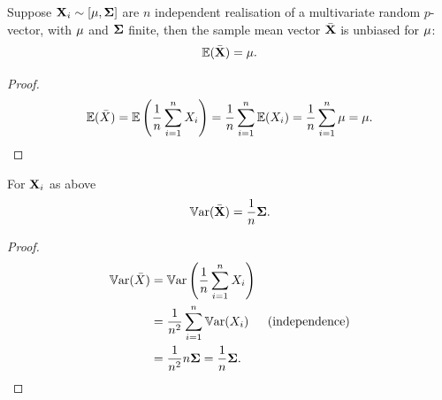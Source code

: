 \documentclass[10pt, a4paper]{article}
\begin{document}
\begin{theorem}
    Suppose $\mathbf{X}_i \sim [\mathbf{\mu}, \mathbf{\Sigma}]$ are $n$ independent realisation of a multivariate random $p$-vector,
    with $\mathbf{\mu}$ and $\mathbf{\Sigma}$ finite,
    then the sample mean vector $\bar{\mathbf{X}}$ is unbiased for $\mathbf{\mu}$:
    \[
    \mathbb{E}(\bar{\mathbf{X}}) = \mathbf{\mu}.
    \]

    \begin{proof}
        \[
        \mathbb{E}(\bar{X}) = \mathbb{E}\left(\frac{1}{n}\sum_{i = 1}^{n}X_i\right) = \frac{1}{n}\sum_{i = 1}^{n}\mathbb{E}(X_i) = \frac{1}{n}\sum_{i = 1}^{n}\mu = \mu.
        \]
    \end{proof}
\end{theorem}

\begin{theorem}
    For $\mathbf{X}_i$ as above
    \[
    \mathbb{V}\mathrm{ar}(\bar{\mathbf{X}}) = \frac{1}{n}\mathbf{\Sigma}.
    \]

    \begin{proof}
        \begin{align*}
            \mathbb{V}\mathrm{ar}(\bar{X}) &= \mathbb{V}\mathrm{ar}\left(\frac{1}{n}\sum_{i = 1}^{n}X_i\right) \\
            &= \frac{1}{n ^ 2}\sum_{i = 1}^{n}\mathbb{V}\mathrm{ar}(X_i) &(\text{independence}) \\
            &= \frac{1}{n ^ 2}n\mathbf{\Sigma} = \frac{1}{n}\mathbf{\Sigma}.
        \end{align*}
    \end{proof}
\end{theorem}
\end{document}
